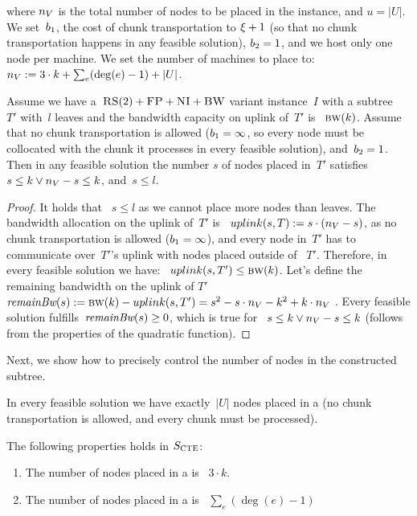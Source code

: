 where $n_V$ is the total number of nodes to be placed in the instance, and $u = |U|$.
  We
set~$b_1$, the cost of chunk transportation to $\xi+1$ (so that no chunk transportation happens in any feasible solution), 
$b_2 = 1$, and we host only one node per machine. We set the
number of machines to place to:
$n_V := 3\cdot k + \sum_e (\deg(e)-1) + |U|$.
\\

\begin{lemma}
  Assume we have a~$\textsc{RS}(2)+\textsc{FP}+\textsc{NI}+\textsc{BW}$ variant instance~$I$ with a subtree
 ~$T'$ with~$l$ leaves and the bandwidth capacity on uplink of~$T'$ is
 ~$\textsc{bw}(k)$. Assume that no chunk transportation is allowed
  ($b_1 = \infty$, so every node must be collocated with the
  chunk it processes in every feasible solution), and~$b_2 = 1$.
  Then in any feasible solution the number $s$ of nodes placed in~$T'$ satisfies~$s \leq k \vee n_V-s\leq k$, and~$s \leq l$.
  \label{lem:bandwidth1}
\end{lemma}

\begin{proof}
It holds that ~$s\leq l$ as we cannot place more nodes than leaves.
  The bandwidth allocation on the uplink of~$T'$ is
 ~$uplink(s,T) := s\cdot (n_V - s)$, as no chunk transportation
  is allowed ($b_1 = \infty$), and every node in~$T'$ has to
  communicate over~$T'$'s uplink with nodes placed outside of
 ~$T'$. Therefore, in every feasible solution we have:
 ~$uplink(s, T') \leq \textsc{bw}(k)$.  Let's define the remaining bandwidth
  on the uplink of $T'$~$\textit{remainBw}(s) := \textsc{bw}(k)-uplink(s, T') = s^2 - s\cdot n_V -
  k^2+k\cdot n_V~$.
  Every feasible solution fulfills~$\textit{remainBw}(s) \geq 0$, which is true for
 ~$s \leq k \vee n_V-s\leq k$ (follows from the properties of the
  quadratic function).
\end{proof}


Next, we show how to precisely control the number of nodes in the
constructed subtree.

\begin{obs}
  In every feasible solution we have exactly~$|U|$ nodes placed in a
  {\UnqSubtree} (no chunk transportation is allowed, and every chunk must be processed).
  \label{obs:unq-full}
\end{obs}


\begin{lemma}
  The following properties holds in $S_{\mathrm{\textsc{CTE}}}$:
  \begin{enumerate}
    \item The number of nodes placed in a {\MatchSubtree} is
   ~$3\cdot k$.
    \item The number of nodes placed in a {\CoverSubtree} is
   ~$\sum_e(\deg(e)-1)$
  \end{enumerate}

  \label{lem:bandwidth2}
\end{lemma}

